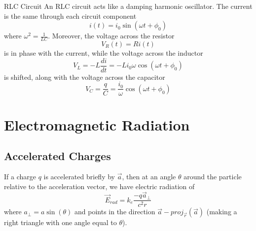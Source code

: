 \documentclass[12pt]{report}
\begin{document}
\begin{rmk}{RLC Circuit}{}
        An RLC circuit acts like a damping harmonic oscillator. The current is the same through each circuit component \begin{equation}
                i(t) = i_0\sin(\omega t+\phi_0)
        \end{equation}
        where $\omega^2 = \frac{1}{LC}$. Moreover, the voltage across the resistor \begin{equation}
                V_R(t) = Ri(t)
        \end{equation}
        is in phase with the current, while the voltage across the inductor \begin{equation}
                V_L = -L\frac{di}{dt} = -Li_0\omega\cos(\omega t+\phi_0)
        \end{equation}
        is shifted, along with the voltage across the capacitor \begin{equation}
                V_C = \frac{q}{C} = \frac{i_0}{\omega}\cos(\omega t+\phi_0)
        \end{equation}
\end{rmk}






\chapter{Electromagnetic Radiation}


\section{Accelerated Charges}

\begin{defn}{}{}
        If a charge $q$ is accelerated briefly by $\vec{a}$, then at an angle $\theta$ around the particle relative to the acceleration vector, we have electric radiation of \begin{equation}
                \vec{E}_{rad} = k_e\frac{-q\vec{a}_{\perp}}{c^2r}
        \end{equation}
        where $a_{\perp} = a\sin(\theta)$ and points in the direction $\vec{a} - proj_{\vec{r}}(\vec{a})$ (making a right triangle with one angle equal to $\theta$).
\end{defn}
\end{document}
